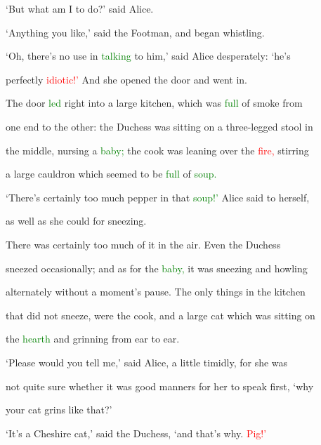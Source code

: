  ‘But what am I to do?’ said Alice.



 ‘Anything you like,’ said the Footman, and began whistling.



 ‘Oh, there’s no use in \textcolor{green}{talking} to him,’ said Alice desperately: ‘he’s

 perfectly \textcolor{red}{idiotic!’} And she opened the door and went in.



 The door \textcolor{green}{led} right into a large kitchen, which was \textcolor{green}{full} of smoke from

 one end to the other: the Duchess was sitting on a three-legged stool in

 the middle, nursing a \textcolor{green}{baby;} the cook was leaning over the \textcolor{red}{fire,} stirring

 a large cauldron which seemed to be \textcolor{green}{full} of \textcolor{green}{soup.}



 ‘There’s certainly too much pepper in that \textcolor{green}{soup!’} Alice said to herself,

 as well as she could for \textcolor{BurntOrange}{sneezing.}



 There was certainly too much of it in the air. Even the Duchess

 \textcolor{BurntOrange}{sneezed} occasionally; and as for the \textcolor{green}{baby,} it was \textcolor{BurntOrange}{sneezing} and \textcolor{BurntOrange}{howling}

 alternately without a moment’s pause. The only things in the kitchen

 that did not \textcolor{BurntOrange}{sneeze,} were the cook, and a large cat which was sitting on

 the \textcolor{green}{hearth} and \textcolor{BurntOrange}{grinning} from ear to ear.



 ‘Please would you tell me,’ said Alice, a little timidly, for she was

 not quite sure whether it was \textcolor{BurntOrange}{good} manners for her to speak first, ‘why

 your cat \textcolor{BurntOrange}{grins} like that?’



 ‘It’s a Cheshire cat,’ said the Duchess, ‘and that’s why. \textcolor{red}{Pig!’}



